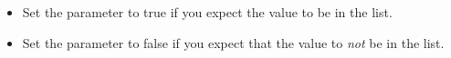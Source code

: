 \begin{itemize}
\item Set the parameter to true{} if you expect the value to be in the list. 
\item Set the parameter to false{} if you expect that the value to \emph{not} be in the list.
\end{itemize}

    